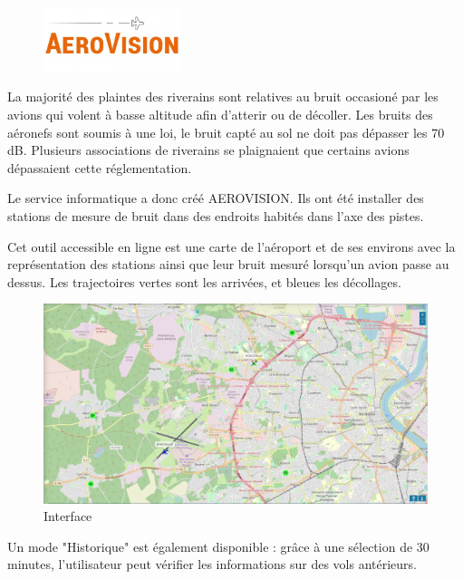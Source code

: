 \begin{figure}[hbt!]
  \centering
  \includegraphics[width=4cm]{Images/logo_aerovision.jpg}
  \label{fig:logoaerovision}
\end{figure}

La majorité des plaintes des riverains sont relatives au bruit occasioné par les avions qui volent à basse altitude afin d'atterir ou de décoller.
Les bruits des aéronefs sont soumis à une loi, le bruit capté au sol ne doit pas dépasser les 70 dB. Plusieurs associations de riverains se plaignaient que certains avions dépassaient cette réglementation.\newline

Le service informatique a donc créé AEROVISION. Ils ont été installer des stations de mesure de bruit dans des endroits habités dans l'axe des pistes.


Cet outil accessible en ligne est une carte de l'aéroport et de ses environs avec la représentation des stations ainsi que leur bruit mesuré lorsqu'un avion passe au dessus. Les trajectoires vertes sont les arrivées, et bleues les décollages.

\begin{figure}[hbt!]
  \centering
  \includegraphics[width=16cm]{Images/aerovision.png}\newline
  \caption{Interface}
  \label{fig:interfaceaerovision}
\end{figure}

Un mode "Historique" est également disponible : grâce à une sélection de 30 minutes, l'utilisateur peut vérifier les informations sur des vols antérieurs.

